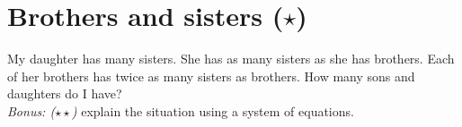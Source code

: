 \documentclass[11pt]{article}
\begin{document}
\section{Brothers and sisters ($\star$)}
\noindent My daughter has many sisters. She has as many sisters as she has
brothers. Each of her brothers has twice as many sisters as brothers. How many
sons and daughters do I have?\\
\emph{Bonus: ($\star\star$)} explain the situation using a system of equations.
\end{document}
